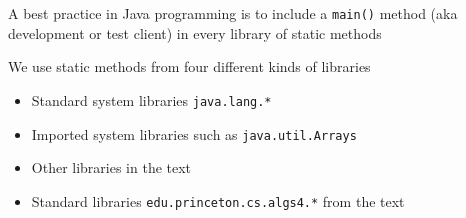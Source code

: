 \documentclass[8pt,a4paper,compress]{beamer}
\begin{document}
\begin{frame}[fragile]
\pause

A best practice in Java programming is to include a \lstinline{main()} method (aka development or test client) in every library of static methods

\pause
\bigskip

We use static methods from four different kinds of libraries
\begin{itemize}
\item Standard system libraries \lstinline{java.lang.*}
\item Imported system libraries such as \lstinline{java.util.Arrays}
\item Other libraries in the text
\item Standard libraries \lstinline{edu.princeton.cs.algs4.*} from the text
\end{itemize}
\end{frame}
\end{document}
